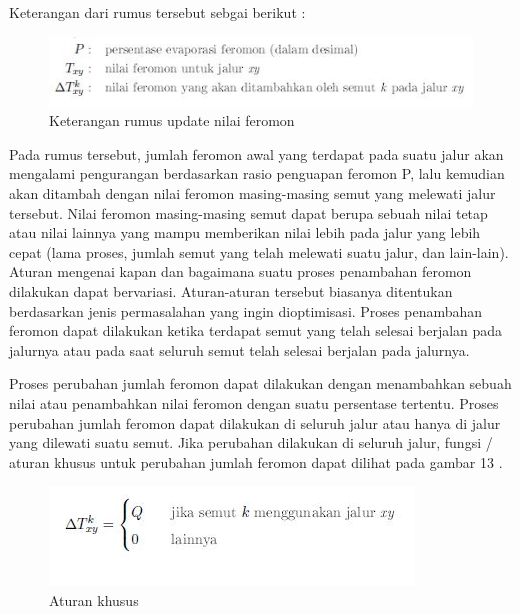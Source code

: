 \documentclass[a4paper,twoside]{article}
\begin{document}
\begin{enumerate}
\begin{itemize}
\begin{enumerate}
				  	  Keterangan dari rumus tersebut sebgai berikut :
				  	  
				  	  \begin{figure}[H]
				  	  	\centering
				  	  	\includegraphics[scale=0.70]{gambar12}
				  	  	\caption[Keterangan Update Nilai Feromon] {Keterangan rumus update nilai feromon}
				  	  	\label{fig:keteranganupdatenilaiferomon}
				  	  \end{figure}
			  	  
			  	  	  Pada rumus tersebut, jumlah feromon awal yang terdapat pada suatu jalur akan mengalami
			  	  	  pengurangan berdasarkan rasio penguapan feromon P, lalu kemudian akan ditambah dengan nilai
			  	  	  feromon masing-masing semut yang melewati jalur tersebut. Nilai feromon masing-masing semut
			  	  	  dapat berupa sebuah nilai tetap atau nilai lainnya yang mampu memberikan nilai lebih pada jalur
			  	  	  yang lebih cepat (lama proses, jumlah semut yang telah melewati suatu jalur, dan lain-lain).
			  	  	  Aturan mengenai kapan dan bagaimana suatu proses penambahan feromon dilakukan dapat
			  	  	  bervariasi. Aturan-aturan tersebut biasanya ditentukan berdasarkan jenis permasalahan yang ingin
			  	  	  dioptimisasi. Proses penambahan feromon dapat dilakukan ketika terdapat semut yang telah selesai
			  	  	  berjalan pada jalurnya atau pada saat seluruh semut telah selesai berjalan pada jalurnya. 
			  	  	  
			  	  	  Proses perubahan jumlah feromon dapat dilakukan dengan menambahkan sebuah nilai atau penambahkan
			  	  	  nilai feromon dengan suatu persentase tertentu.
			  	  	  Proses perubahan jumlah feromon dapat dilakukan di seluruh jalur atau hanya di jalur yang
			  	  	  dilewati suatu semut. Jika perubahan dilakukan di seluruh jalur, fungsi / aturan khusus untuk
			  	  	  perubahan jumlah feromon dapat dilihat pada gambar 13 .
			  	  	  
			  	  	  \begin{figure}[H]
			  	  	  	\centering
			  	  	  	\includegraphics[scale=0.60]{gambar13}
			  	  	  	\caption[Aturan khusus] {Aturan khusus}
			  	  	  	\label{fig:aturankhusus}
			  	  	  \end{figure}
		  	  	  

\end{enumerate}
\end{itemize}
\end{enumerate}
\end{document}
